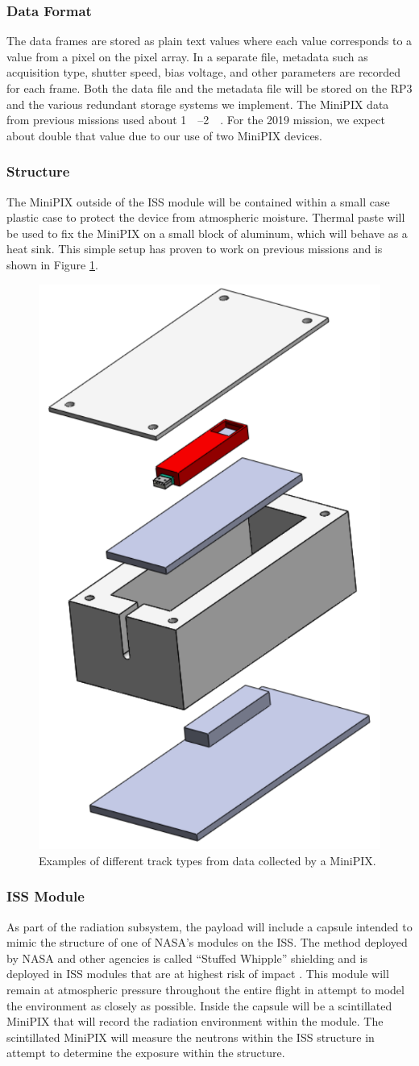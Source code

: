 {\subsubsection{Data Format}
The data frames are stored as plain text values where each value corresponds to a value from a pixel on the pixel array. In a separate file, metadata such as acquisition type, shutter speed, bias voltage, and other parameters are recorded for each frame. Both the data file and the metadata file will be stored on the RP\num{3} and the various redundant storage systems we implement. The MiniPIX data from previous missions used about \SIrange{1}{2}{\giga\byte}. For the 2019 mission, we expect about double that value due to our use of two MiniPIX devices.

\subsubsection{Structure}
The MiniPIX outside of the ISS module will be contained within a small case plastic case to protect the device from atmospheric moisture. Thermal paste will be used to fix the MiniPIX on a small block of aluminum, which will behave as a heat sink. This simple setup has proven to work on previous missions and is shown in Figure \ref{fig:CaseAssembly}.
\begin{figure}[h]
    \includegraphics[scale=1, width=.25\textwidth]{Figures/MinipixCaseAssembly.pdf}
    \caption{Examples of different track types from data collected by a MiniPIX.}
    \label{fig:CaseAssembly}
\end{figure}

\subsubsection{ISS Module}
\label{subsec:ISSModule}
As part of the radiation subsystem, the payload will include a capsule intended to mimic the structure of one of NASA's modules on the ISS.
The method deployed by NASA and other agencies is called ``Stuffed Whipple'' shielding and is deployed in ISS modules that are at highest risk of impact \cite{NASAShielding}.
This module will remain at atmospheric pressure throughout the entire flight in attempt to model the environment as closely as possible.
Inside the capsule will be a scintillated MiniPIX that will record the radiation environment within the module.
The scintillated MiniPIX will measure the neutrons within the ISS structure in attempt to determine the exposure within the structure.

}

